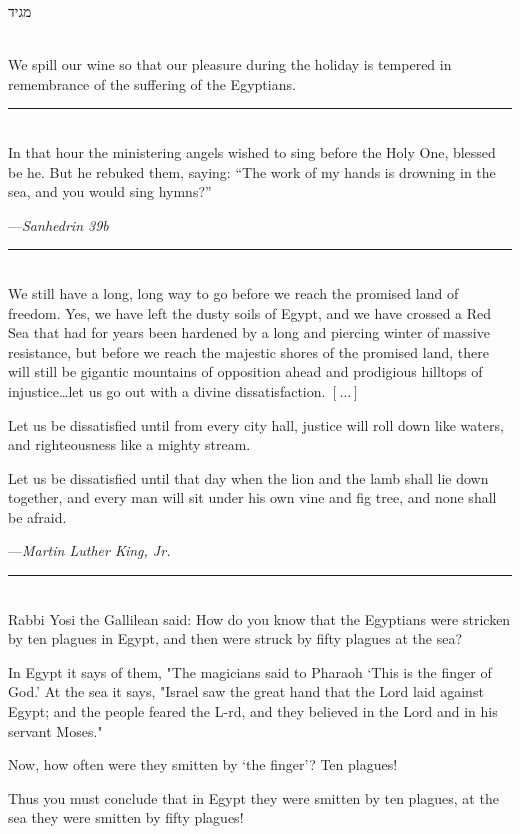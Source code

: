 \documentclass[a4paper,12pt,openany]{memoir}
\newcommand{\HgEllipsis}{\ensuremath{\left[\ldots\right]}}
\newcommand{\HgSource}[1]{\hfill{\small---\itshape{#1}}}
\newcommand{\hchapter}[1]{
  \begin{hebrew}
    \begin{Spacing}{.97}
      \newpage
      \strut

      \vspace{.15em}

      \noindent\Huge #1

      \vspace{1em}
    \end{Spacing}
  \end{hebrew}
}
\newcommand{\HgFill}{\vfill \hrule \vfill}
\newenvironment{HgEnglish}{\strut\\\noindent}{\vspace{1em}}
\newcommand{\LSrc}{\textsuperscript{\upshape{[L]}}}
\begin{document}
\vfill

\hchapter{מגיד}

\begin{HgEnglish}
  We spill our wine so that our pleasure during the holiday is tempered in
  remembrance of the  suffering of the Egyptians.
\end{HgEnglish}

\HgFill

\begin{HgEnglish}
  In that hour the ministering angels wished to sing before the Holy One,
  blessed be he. But he rebuked them, saying: ``The work of my hands is drowning
  in the sea, and you would sing hymns?''
  
  \HgSource{Sanhedrin 39b}
\end{HgEnglish}

\HgFill

\begin{HgEnglish}
We still have a long, long way to go before we reach the promised land of
freedom. Yes, we have left the dusty soils of Egypt, and we have crossed a Red
Sea that had for years been hardened by a long and piercing winter of massive
resistance, but before we reach the majestic shores of the promised land, there
will still be gigantic mountains of opposition ahead and prodigious hilltops of
injustice\ldots{}let us go out with a divine dissatisfaction. \HgEllipsis

Let us be dissatisfied until from every city hall, justice will roll down like
waters, and righteousness like a mighty
stream.

Let us be dissatisfied until that day when the lion and the lamb shall lie down
together, and every man will sit under
his own vine and fig tree, and none shall be afraid.

\HgSource{Martin Luther King, Jr.}
\end{HgEnglish}

\HgFill

\begin{HgEnglish}
Rabbi Yosi the Gallilean said: How do you know that the Egyptians were stricken
by ten plagues in Egypt, and then were struck by fifty plagues at the sea?

In Egypt it says of them, "The magicians said to Pharaoh `This is the finger of
God.' At the sea it says, "Israel saw the great hand that the Lord laid against
Egypt; and the people feared the L-rd, and they believed in the Lord and in his
servant Moses."

Now, how often were they smitten by `the finger'? Ten plagues!

Thus you must conclude that in Egypt they were smitten by ten plagues, at the
sea they were smitten by fifty plagues! \LSrc

\end{HgEnglish}
\end{document}
